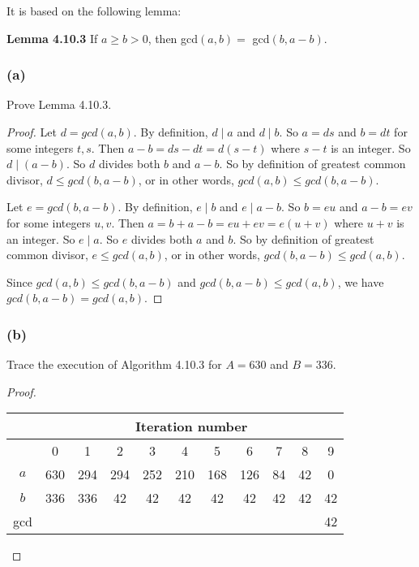 \documentclass[14pt]{extarticle}
\newcommand{\cy}{\color{cyan}}
\begin{document}
It is based on the following lemma:

{\bf Lemma 4.10.3} If $a \geq b > 0$, then gcd$(a, b) =$ gcd$(b, a - b)$.

\subsubsection{(a)}
Prove Lemma 4.10.3.

\begin{proof}
    Let $d = gcd(a,b)$. By definition, $d \mid a$ and $d \mid b$. So $a = ds$ and $b = dt$ for some integers $t,s$. Then $a-b = ds - dt = d(s-t)$ where $s-t$ is an integer. So $d \mid (a-b)$. So $d$ divides both $b$ and $a-b$. So by definition of greatest common divisor, $d \leq gcd(b, a-b)$, or in other words, $gcd(a,b) \leq gcd(b, a-b)$.

    Let $e = gcd(b,a-b)$. By definition, $e \mid b$ and $e \mid a-b$. So $b = eu$ and $a-b = ev$ for some integers $u,v$. Then $a = b + a-b = eu + ev = e(u+v)$ where $u+v$ is an integer. So $e \mid a$. So $e$ divides both $a$ and $b$. So by definition of greatest common divisor, $e \leq gcd(a,b)$, or in other words, $gcd(b, a-b) \leq gcd(a,b)$.

    Since $gcd(a,b) \leq gcd(b, a-b)$ and $gcd(b, a-b) \leq gcd(a,b)$, we have $gcd(b, a-b) = gcd(a,b)$.
\end{proof}

\subsubsection{(b)}
Trace the execution of Algorithm 4.10.3 for $A = 630$ and $B = 336$.

\begin{proof}
    \begin{center}
        \begin{tabular}{|c|c|c|c|c|c|c|c|c|c|c|}
            \hline
                & \multicolumn{10}{c|}{{\bf \cy Iteration number}}                                                    \\
            \hline
                & 0                                                & 1   & 2   & 3   & 4   & 5   & 6   & 7  & 8  & 9  \\
            \hline
            $a$ & 630                                              & 294 & 294 & 252 & 210 & 168 & 126 & 84 & 42 & 0  \\
            \hline
            $b$ & 336                                              & 336 & 42  & 42  & 42  & 42  & 42  & 42 & 42 & 42 \\
            \hline
            gcd &                                                  &     &     &     &     &     &     &    &    & 42 \\
            \hline
        \end{tabular}
    \end{center}
\end{proof}
\end{document}
